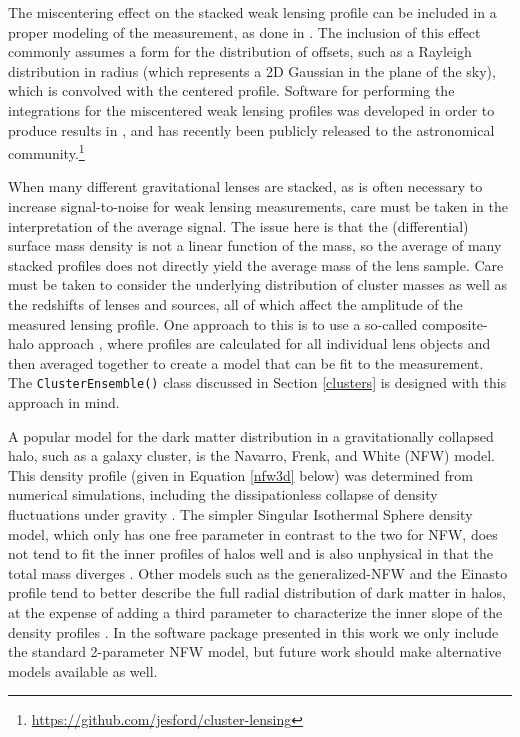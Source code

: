 \documentclass[twocolumn]{aastex6}
\newcommand{\code}{\lstinline[style=codeintext]}
\begin{document}
The miscentering effect on the stacked weak lensing profile can be included in a proper modeling of the measurement, as done in \citet{Johnston07, Mandelbaum10, Oguri11, George12, Sehgal13, Oguri14, Ford14, Ford15, Simet16}. The inclusion of this effect commonly assumes a form for the distribution of offsets, such as a Rayleigh distribution in radius (which represents a 2D Gaussian in the plane of the sky), which is convolved with the centered profile. Software for performing the integrations for the miscentered weak lensing profiles was developed in order to produce results in \citet{Ford14, Ford15}, and has recently been publicly released to the astronomical community.\footnote{\url{https://github.com/jesford/cluster-lensing}}

When many different gravitational lenses are stacked, as is often necessary to increase signal-to-noise for weak lensing measurements, care must be taken in the interpretation of the average signal. The issue here is that the (differential) surface mass density is not a linear function of the mass, so the average of many stacked profiles does not directly yield the average mass of the lens sample. Care must be taken to consider the underlying distribution of cluster masses as well as the redshifts of lenses and sources, all of which affect the amplitude of the measured lensing profile. One approach to this is to use a so-called composite-halo approach \citep[e.g.][]{Hildebrandt11, Ford12, Ford14, Ford15, Simet16}, where profiles are calculated for all individual lens objects and then averaged together to create a model that can be fit to the measurement. The \code{ClusterEnsemble()} class discussed in Section \ref{clusters} is designed with this approach in mind.

A popular model for the dark matter distribution in a gravitationally collapsed halo, such as a galaxy cluster, is the Navarro, Frenk, and White (NFW) model. This density profile (given in Equation \ref{nfw3d} below) was determined from numerical simulations, including the dissipationless collapse of density fluctuations under gravity \citep{nfw97}. The simpler Singular Isothermal Sphere density model, which only has one free parameter in contrast to the two for NFW, does not tend to fit the inner profiles of halos well and is also unphysical in that the total mass diverges \citep{Schneider06_WeakGravLens}. Other models such as the generalized-NFW and the Einasto profile tend to better describe the full radial distribution of dark matter in halos, at the expense of adding a third parameter to characterize the inner slope of the density profiles \citep[see {\emph e.g.} discussion in][]{Dutton14}. In the software package presented in this work we only include the standard 2-parameter NFW model, but future work should make alternative models available as well.
\end{document}
